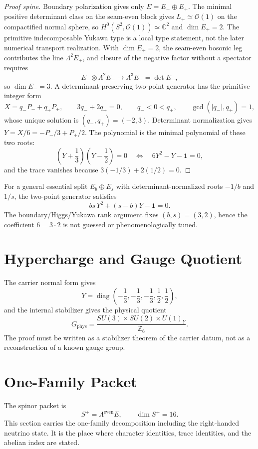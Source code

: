 \documentclass[11pt,a4paper]{article}
\begin{document}
\begin{proof}[Proof spine]
Boundary polarization gives only $E=E_-\oplus E_+$. The minimal positive determinant class on the
seam-even block gives $L_+\simeq\mathcal O(1)$ on the compactified normal sphere, so
$H^0(S^2,\mathcal O(1))\simeq\mathbb C^2$ and $\dim E_+=2$. The primitive indecomposable Yukawa
type is a local type statement, not the later numerical transport realization. With $\dim E_+=2$,
the seam-even bosonic leg contributes the line $\Lambda^2E_+$, and closure of the negative factor
without a spectator requires
\[
E_-\otimes\Lambda^2E_-\longrightarrow\Lambda^3E_-=\det E_-,
\]
so $\dim E_-=3$. A determinant-preserving two-point generator has the primitive integer form
\[
X=q_-P_-+q_+P_+,\qquad 3q_-+2q_+=0,\qquad q_-<0<q_+,\qquad \gcd(|q_-|,q_+)=1,
\]
whose unique solution is $(q_-,q_+)=(-2,3)$. Determinant normalization gives
$Y=X/6=-P_-/3+P_+/2$. The polynomial is the minimal polynomial of these two roots:
\[
\left(Y+\frac13\right)\left(Y-\frac12\right)=0
\quad\Longleftrightarrow\quad
6Y^2-Y-\mathbf 1=0,
\]
and the trace vanishes because $3(-1/3)+2(1/2)=0$.
\end{proof}

\begin{remark}
For a general essential split $E_b\oplus E_s$ with determinant-normalized roots
$-1/b$ and $1/s$, the two-point generator satisfies
\[
bs\,Y^2+(s-b)Y-\mathbf 1=0.
\]
The boundary/Higgs/Yukawa rank argument fixes $(b,s)=(3,2)$, hence the coefficient $6=3\cdot2$
is not guessed or phenomenologically tuned.
\end{remark}

\section{Hypercharge and Gauge Quotient}

The carrier normal form gives
\[
Y=\operatorname{diag}\left(-\frac13,-\frac13,-\frac13,\frac12,\frac12\right),
\]
and the internal stabilizer gives the physical quotient
\[
G_{\mathrm{phys}}
=
\frac{SU(3)\times SU(2)\times U(1)_Y}{\mathbb Z_6}.
\]
The proof must be written as a stabilizer theorem of the carrier datum, not as a reconstruction of
a known gauge group.

\section{One-Family Packet}

The spinor packet is
\[
S^+=\Lambda^{\mathrm{even}}E,
\qquad
\dim S^+=16.
\]
This section carries the one-family decomposition including the right-handed neutrino state. It is
the place where character identities, trace identities, and the abelian index are stated.
\end{document}
